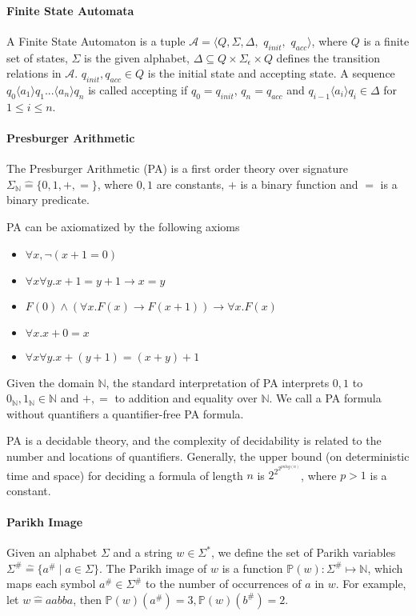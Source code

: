 \documentclass[runningheads]{llncs}
\newcommand{\Def}{\hat{=}}
\begin{document}
\paragraph{Finite State Automata}
A Finite State Automaton is a tuple 
$\mathcal{A}=\langle Q,\Sigma,\Delta,$ $q_{\textit{init}},$ $q_{\textit{acc}}\rangle$, 
where $Q$ is a finite set of states, 
$\Sigma$ is the given alphabet,
$\Delta\subseteq Q\times \Sigma_\epsilon\times Q$ 
defines the transition relations in $\mathcal{A}$.
$q_{\textit{init}},q_{\textit{acc}}\in Q$ is the initial state and accepting state. 
A sequence $q_0 \langle a_1 \rangle  q_1 ... \langle a_n\rangle q_n$ is called accepting if $q_0 = q_{\textit{init}}$, $q_n = q_{\textit{acc}}$ and $q_{i-1}\langle a_i \rangle q_i \in \Delta$ for $1\le i\le n$.

\paragraph{Presburger Arithmetic} \label{PA}
The Presburger Arithmetic (PA) is a first order theory over signature 
$\Sigma_\mathbb{N}\Def  \{0,1,+,=\}$, where $0,1$ are constants, 
$+$ is a binary function and $=$ is a binary predicate.

PA can be axiomatized by the following axioms \cite{PA} 

\begin{itemize}
    \item $\forall x, \neg (x+1=0)$
    \item $\forall x \forall y. x+1=y+1 \to x=y$
    \item $F(0) \wedge (\forall x. F(x)\to F(x+1)) \to \forall x. F(x)$ 
    \item $\forall x. x+0=x$
    \item $\forall x \forall y. x+(y+1)=(x+y)+1$
\end{itemize}

Given the domain $\mathbb{N}$,
the standard interpretation of PA interprets 
$0,1$ to $0_\mathbb{N},1_\mathbb{N}\in \mathbb{N}$
and $+,=$ to addition and equality over $\mathbb{N}$.
We call a PA formula without quantifiers a quantifier-free PA formula.

PA is a decidable theory, 
and the complexity of decidability is related to 
the number and locations of quantifiers.
Generally, 
the upper bound (on deterministic time and space) 
for deciding a formula of length $n$ is $2^{2^{2^{p n log(n)}}}$,
where $p>1$ is a constant\cite{Oppen69}. 

\paragraph{Parikh Image}
Given an alphabet $\Sigma$ and a string $w\in \Sigma^*$, 
we define the set of Parikh variables 
$\Sigma^\# \Def \{a^\# \mid a\in \Sigma\}$.
The Parikh image of $w$ is a function 
$\mathbb{P}(w): \Sigma^\# \mapsto \mathbb{N}$,
which maps each symbol $a^\#\in \Sigma^\#$ to the number of occurrences
of $a$ in $w$.
For example, let $w\Def aabba$,
then $\mathbb{P}(w)(a^\#)=3,\mathbb{P}(w)(b^\#)=2$.
\end{document}
